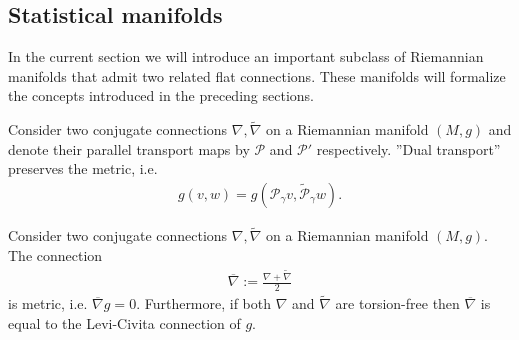 \subsection{Statistical manifolds}

    In the current section we will introduce an important subclass of Riemannian manifolds that admit two related flat connections. These manifolds will formalize the concepts introduced in the preceding sections.

    \begin{property}
        Consider two conjugate connections $\nabla, \widetilde{\nabla}$ on a Riemannian manifold $(M,g)$ and denote their parallel transport maps by $\mathcal{P}$ and $\mathcal{P'}$ respectively. ''Dual transport'' preserves the metric, i.e.
        \begin{gather}
            g(v, w) = g\left(\mathcal{P}_\gamma v, \widetilde{\mathcal{P}}_\gamma w\right).
        \end{gather}
    \end{property}

    \begin{property}
        Consider two conjugate connections $\nabla, \widetilde{\nabla}$ on a Riemannian manifold $(M,g)$. The connection
        \begin{gather}
            \overline{\nabla} := \frac{\nabla+\widetilde{\nabla}}{2}
        \end{gather}
        is metric, i.e. $\overline{\nabla}g = 0$. Furthermore, if both $\nabla$ and $\widetilde{\nabla}$ are torsion-free then $\overline{\nabla}$ is equal to the Levi-Civita connection of $g$.
    \end{property}

